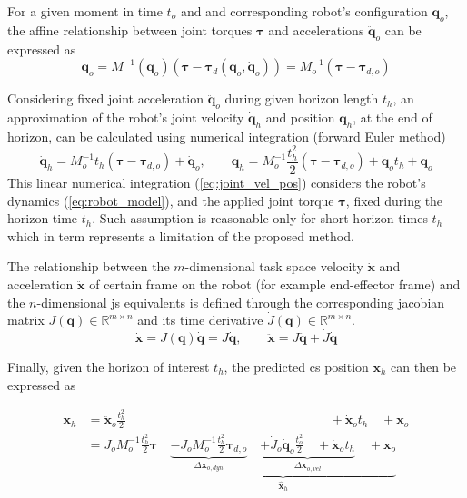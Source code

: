 For a given moment in time $t_o$ and and corresponding robot's configuration $\bm{q}_o$, the affine relationship between joint torques $\bm{\tau}$ and accelerations $\ddot{\bm{q}}_{o}$ can be expressed as
\begin{equation}
    \ddot{\bm{q}}_{o} = M^{-1}(\bm{q}_o)(\bm{\tau} - \bm{\tau}_d(\bm{q}_o,\dot{\bm{q}}_o)) = M_o^{-1}(\bm{\tau} - \bm{\tau}_{d,o})
\end{equation}

Considering fixed joint acceleration $\ddot{\bm{q}}_{o}$ during given horizon length $t_h$, an approximation of the robot's joint velocity $\dot{\bm{q}}_{h}$ and position $\bm{q}_{h}$, at the end of horizon, can be calculated using numerical integration (forward Euler method) 
\begin{equation}
    \dot{\bm{q}}_{h} = M_o^{-1}t_h(\bm{\tau} - \bm{\tau}_{d,o}) + \dot{\bm{q}}_{o}, \qquad \bm{q}_{h} = M_o^{-1}\frac{t_h^2}{2}(\bm{\tau} - \bm{\tau}_{d,o}) + \dot{\bm{q}}_{o}t_h + \bm{q}_{o}
    \label{eq:joint_vel_pos}
\end{equation}
This linear numerical integration (\ref{eq:joint_vel_pos}) considers the robot's dynamics (\ref{eq:robot_model}), and the applied joint torque $\bm{\tau}$, fixed during the horizon time $t_h$. Such assumption is reasonable only for short horizon times $t_h$ which in term represents a limitation of the proposed method.

The relationship between the $m$-dimensional task space velocity $\dot{\bm{x}}$ and acceleration $\ddot{\bm{x}}$ of certain frame on the robot (for example end-effector frame) and the $n$-dimensional \gls{js} equivalents is defined through the corresponding jacobian matrix $J(\bm{q})\in\mathbb{R}^{m\times n}$ and its time derivative $\dot{J}(\bm{q})\in\mathbb{R}^{m\times n}$. 
\begin{equation}
    \dot{\bm{x}} = J(\bm{q})\dot{\bm{q}} = J \dot{\bm{q}}, \qquad  \ddot{\bm{x}} = J \ddot{\bm{q}} + \dot{J} \dot{\bm{q}}
\end{equation}

Finally, given the horizon of interest $t_h$, the predicted \gls{cs} position $\bm{x}_{h}$ can then be expressed as

\begin{equation}
\begin{split}
    {\bm{x}}_{h} &= \ddot{\bm{x}}_o\frac{t_h^2}{2}   \qquad\qquad\qquad\qquad\qquad\qquad\qquad\qquad+\dot{\bm{x}}_ot_h \quad +\!  \bm{x}_o\\
    &=  J_o M_o^{-1}\frac{t_h^2}{2}\bm{\tau} \quad \underbrace{\underbrace{-
    J_o M_o^{-1}\frac{t_h^2}{2}\bm{\tau}_{d,o}}_{\Delta \bm{x}_{o,dyn}}  \quad \underbrace{ +\dot{J}_o \dot{\bm{q}}_o\frac{t_o^2}{2} \quad+ \dot{\bm{x}}_ot_h}_{\Delta \bm{x}_{o,vel}} \quad + \bm{x}_{o} }_{\hat{\bm{x}}_{h}}
    \end{split}
    \label{eq:pred_pos}
\end{equation}

